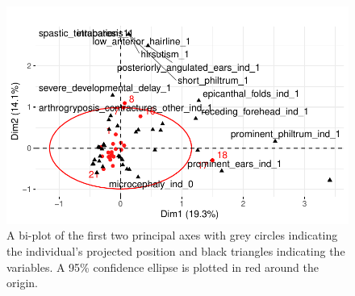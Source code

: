 \documentclass[
  letterpaper,
  DIV=11,
  numbers=noendperiod]{scrartcl}
\begin{document}
\begin{figure}

{\centering \includegraphics{paper_files/figure-pdf/fig-biplotprelim-1.pdf}

}

\caption{\label{fig-biplotprelim}A bi-plot of the first two principal
axes with grey circles indicating the individual's projected position
and black triangles indicating the variables. A 95\% confidence ellipse
is plotted in red around the origin.}

\end{figure}
\end{document}
